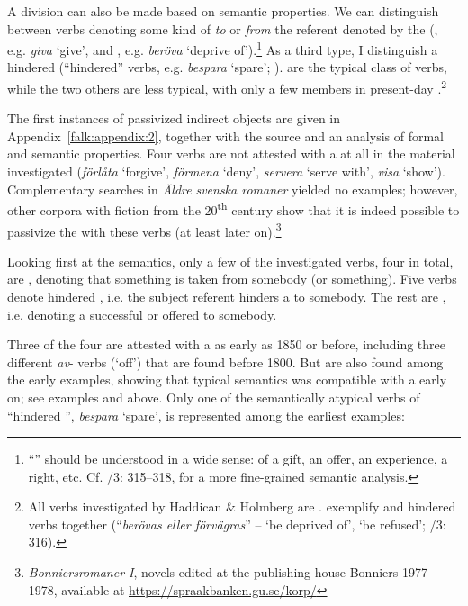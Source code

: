 \documentclass[output=paper]{langscibook}
\begin{document}
A division can also be made based on semantic properties. We can distinguish between  verbs denoting some kind of  \textit{to} or  \textit{from} the referent denoted by the  (, e.g. \textit{giva} ‘give’, and , e.g. \textit{beröva} ‘deprive of’).\footnote{“” should be understood in a wide sense:  of a gift, an offer, an experience, a right, etc. Cf. \citealt{TelemanEtAl1999}/3: 315–318, \citet{Valdeson2021} for a more fine-grained semantic analysis.} As a third type, I distinguish a hindered  (“hindered” verbs, e.g. \textit{bespara} ‘spare’; \citealt{Valdeson2021}).  are the typical class of  verbs, while the two others are less typical, with only a few members in present-day .\footnote{All verbs investigated by Haddican \& Holmberg are . \citet{TelemanEtAl1999} exemplify  and hindered  verbs together (“\textit{berövas eller förvägras}” – ‘be deprived of’, ‘be refused’; \citealt{TelemanEtAl1999}/3: 316).} 



The first instances of passivized indirect objects are given in Appendix~\ref{falk:appendix:2}, together with the source and an analysis of formal and semantic properties. Four verbs are not attested with a  at all in the material investigated (\textit{förlåta} ‘forgive’, \textit{förmena} ‘deny’, \textit{servera} ‘serve with’, \textit{visa} ‘show’). Complementary searches in \textit{Äldre} \textit{svenska romaner} yielded no examples; however, other corpora with fiction from the 20\textsuperscript{th} century show that it is indeed possible to passivize the  with these verbs (at least later on).\footnote{\textit{Bonniersromaner I}, novels edited at the publishing house Bonniers 1977–1978, available at \url{https://spraakbanken.gu.se/korp/}} 



Looking first at the semantics, only a few of the investigated verbs, four in total, are , denoting that something is taken from somebody (or something). Five verbs denote hindered , i.e. the subject referent hinders a  to somebody. The rest are , i.e. denoting a successful or offered  to somebody. 



Three of the four  are attested with a  as early as 1850 or before, including three different \textit{av}{}- verbs (‘off’) that are found before 1800. But  are also found among the early examples, showing that typical  semantics was compatible with a  early on; see examples  and  above. Only one of the semantically atypical verbs of “hindered ”, \textit{bespara} ‘spare’, is represented among the earliest examples:
\end{document}
